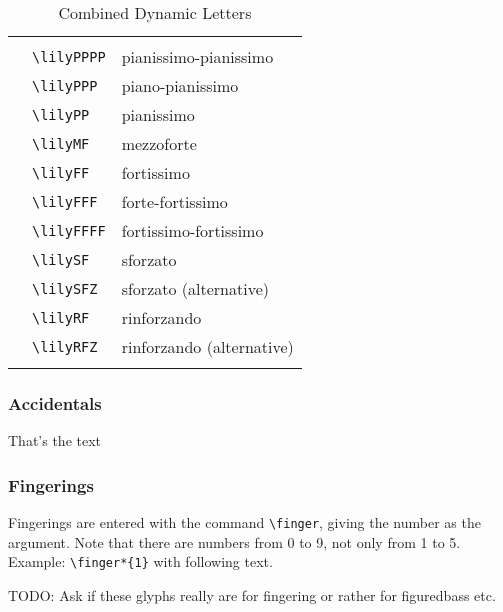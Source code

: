 \documentclass{article}
\newcommand*{\cmd}[1]{\texttt{\textbackslash #1}}
\newcommand{\tmpCaption}{} %
\newcommand{\tmpLabel}{}
\newenvironment{reftable}[2]
	{%
		\renewcommand{\tmpCaption}{#1}
		\renewcommand{\tmpLabel}{#2}
		\begin{table}[ht]
		\begin{center}
		\begin{tabular}[t]{lll}
		\hline
		&\\
	}
	{%
		&\\
		\hline
		\end{tabular}
		\caption{\tmpCaption}
		\label{table:\tmpLabel}
		\end{center}
		\end{table}
	}
\begin{document}
\begin{reftable}{Combined Dynamic Letters}{combinedDynLetters}
\lilyPPPP* & \cmd{lilyPPPP} & pianissimo-pianissimo\\
\lilyPPP* & \cmd{lilyPPP} & piano-pianissimo\\
\lilyPP* & \cmd{lilyPP} & pianissimo\\
\lilyMF* & \cmd{lilyMF} & mezzoforte\\
\lilyFF* & \cmd{lilyFF} & fortissimo\\
\lilyFFF* & \cmd{lilyFFF} & forte-fortissimo\\
\lilyFFFF* & \cmd{lilyFFFF} & fortissimo-fortissimo\\

\lilySF* & \cmd{lilySF} & sforzato\\
\lilySFZ* & \cmd{lilySFZ} & sforzato (alternative)\\
\lilyRF* & \cmd{lilyRF} & rinforzando\\
\lilyRFZ* & \cmd{lilyRFZ} & rinforzando (alternative)\\

\end{reftable}

\subsubsection{Accidentals}
\flatflat That's the text

\subsubsection{Fingerings}
Fingerings are entered with the command \cmd{finger}, giving the number as the argument. Note that there are numbers from 0 to 9, not only from 1 to 5. Example: \cmd{finger*\{1\}}
with following text.

TODO: Ask if these glyphs really are for fingering or rather for figuredbass etc.
\end{document}

